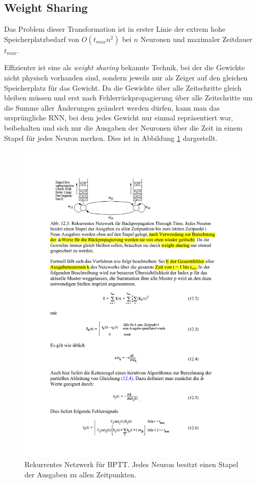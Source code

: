 \subsection*{Weight Sharing}
Das Problem dieser Transformation ist in erster Linie der extrem hohe Speicherplatzbedarf von $O(t_{max} n^2)$ bei $n$ Neuronen und maximaler Zeitdauer $t_{max}$.

Effizienter ist eine als \emph{weight sharing} bekannte Technik, bei der die Gewichte nicht physisch vorhanden sind, sondern jeweils nur als Zeiger auf den gleichen Speicherplatz für das Gewicht. Da die Gewichte über alle Zeitschritte gleich bleiben müssen und erst nach Fehlerrückpropagierung über alle Zeitschritte um die Summe aller Änderungen geändert werden dürfen, kann man das ursprüngliche RNN, bei dem jedes Gewicht nur einmal repräsentiert war, beibehalten und sich nur die Ausgaben der Neuronen über die Zeit in einem Stapel für jedes Neuron merken. 
Dies ist in Abbildung \ref{fig:ch05_rnn-weight-sharing} dargestellt.

\begin{figure}[ht!] \centering 
	\includegraphics[width=\linewidth]{figures/ch05_rnn-weight-sharing.pdf}
	\caption{Rekurrentes Netzwerk für BPTT. Jedes Neuron besitzt einen Stapel der Ausgaben zu allen Zeitpunkten.}
	\label{fig:ch05_rnn-weight-sharing}
\end{figure}

